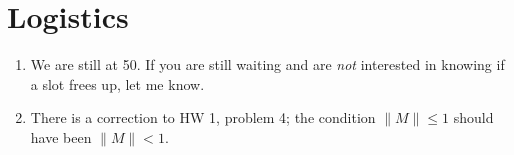 \section{Logistics}

\begin{enumerate}
\item
  We are still at 50.  If you are still waiting and are {\em not}
  interested in knowing if a slot frees up, let me know.
\item
  There is a correction to HW 1, problem 4; the condition $\|M\| \leq 1$
  should have been $\|M\| < 1$.
\end{enumerate}
